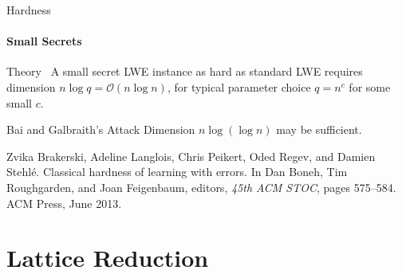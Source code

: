 \documentclass[10pt,compress]{beamer}
\begin{document}
\begin{frame}{Hardness}
  \framesubtitle{Small Secrets}
  \begin{alertblock}{Theory~\cite{STOC:BLPRS13}}
    A small secret LWE instance as hard as standard LWE requires dimension $n \log{q} = \mathcal{O}(n \log{n})$, for typical parameter choice $q=n^c$ for some small $c$.
  \end{alertblock} 

  \begin{alertblock}{Bai and Galbraith’s Attack}
    Dimension $n \log({\log{n}})$ may be sufficient.
  \end{alertblock}

  \begin{thebibliography}{99}
    Zvika Brakerski, Adeline Langlois, Chris Peikert, Oded Regev, and Damien
    Stehl{\'e}.
    \newblock Classical hardness of learning with errors.
    \newblock In Dan Boneh, Tim Roughgarden, and Joan Feigenbaum, editors, {\em
      45th ACM STOC}, pages 575--584. {ACM} Press, June 2013.
  \end{thebibliography}

\end{frame}

\section{Lattice Reduction}
\end{document}
